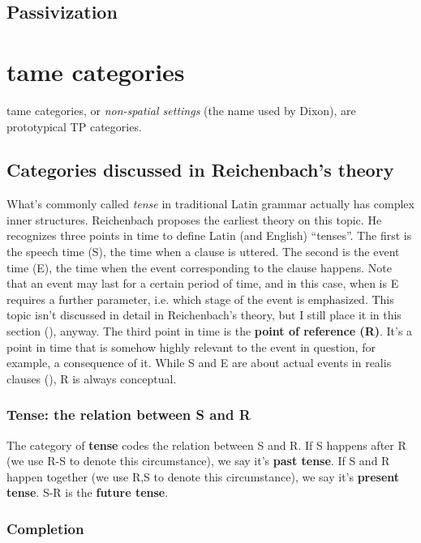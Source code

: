 \documentclass[UTF8, a4paper, oneside, scheme=plain]{ctexart}
\newcommand*{\concept}[1]{\textbf{#1}}
\newcommand*{\term}[1]{\emph{#1}}
\begin{document}
\subsection{Passivization}

\section{\ac{tame} categories}

\ac{tame} categories, or \term{non-spatial settings} (the name used by Dixon),
are prototypical TP categories.

\subsection{Categories discussed in Reichenbach's theory}

What's commonly called \term{tense} in traditional Latin grammar actually has complex inner structures.
Reichenbach proposes the earliest theory on this topic.
He recognizes three points in time to define Latin (and English) ``tenses''.
The first is the speech time (S), 
the time when a clause is uttered.
The second is the event time (E),
the time when the event corresponding to the clause happens.
Note that an event may last for a certain period of time,
and in this case, 
when is E requires a further parameter,
i.e. which stage of the event is emphasized.
This topic isn't discussed in detail in Reichenbach's theory,
but I still place it in this section (), anyway.
The third point in time is the \concept{point of reference (R)}.
It's a point in time that is somehow highly relevant to the event in question,
for example, a consequence of it.
While S and E are about actual events in realis clauses (),
R is always conceptual.

\subsubsection{Tense: the relation between S and R}

The category of \concept{tense} codes the relation between S and R.
If S happens after R (we use R-S to denote this circumstance),
we say it's \concept{past tense}.
If S and R happen together (we use R,S to denote this circumstance),
we say it's \concept{present tense}.
S-R is the \concept{future tense}.

\subsubsection{Completion}\label{sec:completion}
\end{document}
